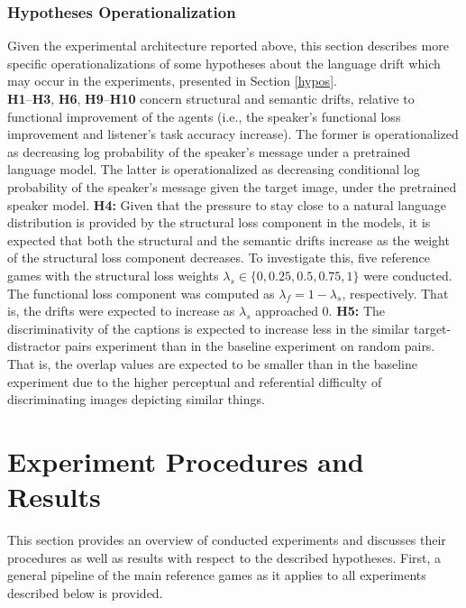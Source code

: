 \subsubsection{Hypotheses Operationalization}
Given the experimental architecture reported above, this section describes more specific operationalizations of some hypotheses about the language drift which may occur in the experiments, presented in Section \ref{hypos}.\\
\newline
\textbf{H1}--\textbf{H3}, \textbf{H6}, \textbf{H9}--\textbf{H10} concern structural and semantic drifts, relative to functional improvement of the agents (i.e., the speaker's functional loss improvement and listener's task accuracy increase). The former is operationalized as decreasing log probability of the speaker's message under a pretrained language model. The latter is operationalized as decreasing conditional log probability of the speaker's message given the target image, under the pretrained speaker model. \newline
\textbf{H4:} Given that the pressure to stay close to a natural language distribution is provided by the structural loss component in the models, it is expected that both the structural and the semantic drifts increase as the weight of the structural loss component decreases. To investigate this, five reference games with the structural loss weights $\lambda_s \in \{0, 0.25, 0.5, 0.75, 1\}$ were conducted. The functional loss component was computed as $\lambda_f = 1 - \lambda_s$, respectively. That is, the drifts were expected to increase as $\lambda_s$ approached 0.\newline
\textbf{H5:} The discriminativity of the captions is expected to increase less in the similar target-distractor pairs experiment than in the baseline experiment on random pairs. That is, the overlap values are expected to be smaller than in the baseline experiment due to the higher perceptual and referential difficulty of discriminating images depicting similar things. 

\section{Experiment Procedures and Results}

This section provides an overview of conducted experiments and discusses their procedures as well as results with respect to the described hypotheses.
First, a general pipeline of the main reference games as it applies to all experiments described below is provided.

